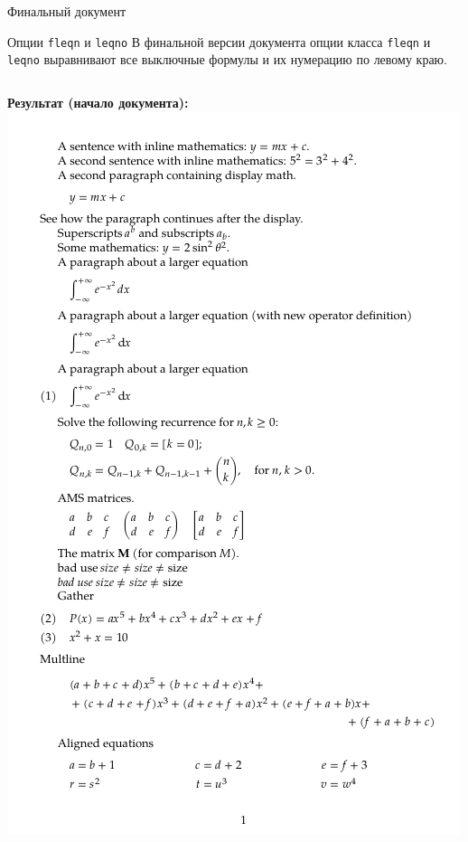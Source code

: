 \documentclass[aspectratio=169]{beamer}
\begin{document}
\begin{frame}{Финальный документ}
    \begin{block}{Опции \texttt{fleqn} и \texttt{leqno}}
        В финальной версии документа опции класса \texttt{fleqn} и \texttt{leqno} выравнивают все выключные формулы и их нумерацию по левому краю.
    \end{block}
    \begin{columns}[T]
        \begin{column}{0.5\textwidth}
            \textbf{Результат (начало документа):}
            \includegraphics[width=\textwidth, height=0.6\textheight, keepaspectratio]{image/8_1.png}
        \end{column}

\end{columns}
\end{frame}
\end{document}
